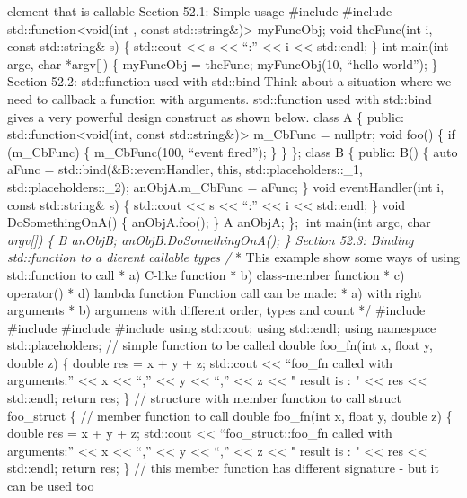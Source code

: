 element that is callable Section 52.1: Simple usage \#include \#include
std::function\textless void(int , const std::string\&)\textgreater{}
myFuncObj; void theFunc(int i, const std::string\& s) \{ std::cout
\textless\textless{} s \textless\textless{} ``:'' \textless\textless{} i
\textless\textless{} std::endl; \} int main(int argc, char *argv{[}{]})
\{ myFuncObj = theFunc; myFuncObj(10, ``hello world''); \} Section 52.2:
std::function used with std::bind Think about a situation where we need
to callback a function with arguments. std::function used with std::bind
gives a very powerful design construct as shown below. class A \{
public: std::function\textless void(int, const
std::string\&)\textgreater{} m\_CbFunc = nullptr; void foo() \{ if
(m\_CbFunc) \{ m\_CbFunc(100, ``event fired''); \} \} \}; class B \{
public: B() \{ auto aFunc = std::bind(\&B::eventHandler, this,
std::placeholders::\_1, std::placeholders::\_2); anObjA.m\_CbFunc =
aFunc; \} void eventHandler(int i, const std::string\& s) \{ std::cout
\textless\textless{} s \textless\textless{} ``:'' \textless\textless{} i
\textless\textless{} std::endl; \} void DoSomethingOnA() \{
anObjA.foo(); \} A anObjA; \}; int main(int argc, char
\emph{argv{[}{]}) \{ B anObjB; anObjB.DoSomethingOnA(); \} Section 52.3:
Binding std::function to a dierent callable types /} * This example show
some ways of using std::function to call * a) C-like function * b)
class-member function * c) operator() * d) lambda function \emph{ }
Function call can be made: * a) with right arguments * b) argumens with
different order, types and count */ \#include \#include \#include
\#include using std::cout; using std::endl; using namespace
std::placeholders; // simple function to be called double foo\_fn(int x,
float y, double z) \{ double res = x + y + z; std::cout
\textless\textless{} ``foo\_fn called with arguments:''
\textless\textless{} x \textless\textless{} ``,'' \textless\textless{} y
\textless\textless{} ``,'' \textless\textless{} z \textless\textless{} "
result is : " \textless\textless{} res \textless\textless{} std::endl;
return res; \} // structure with member function to call struct
foo\_struct \{ // member function to call double foo\_fn(int x, float y,
double z) \{ double res = x + y + z; std::cout \textless\textless{}
``foo\_struct::foo\_fn called with arguments:'' \textless\textless{} x
\textless\textless{} ``,'' \textless\textless{} y \textless\textless{}
``,'' \textless\textless{} z \textless\textless{} " result is : "
\textless\textless{} res \textless\textless{} std::endl; return res; \}
// this member function has different signature - but it can be used too
